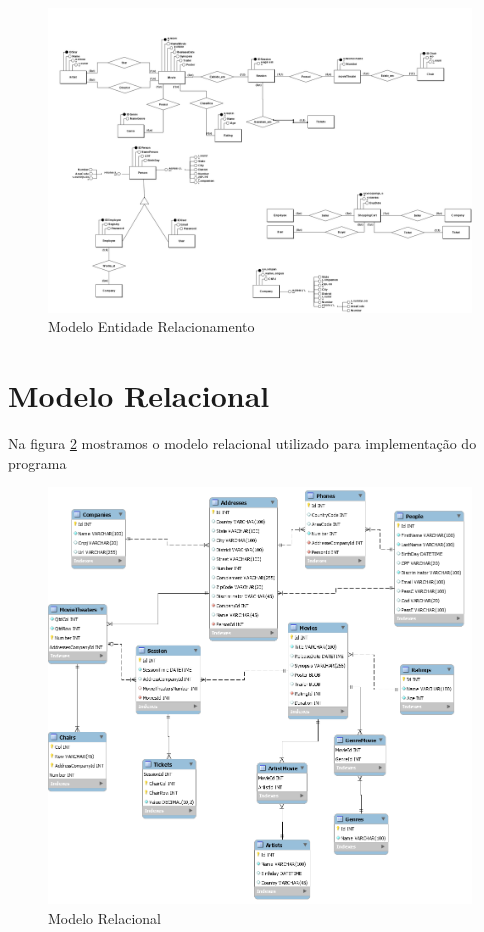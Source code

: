 \documentclass[a4paper,10pt]{article}
\begin{document}
\begin{figure}[h]
\includegraphics[width=\columnwidth]{UnBCineFlix_MER}%
\caption{Modelo Entidade Relacionamento}%
\label{fig:mer}%
\end{figure}

\section{Modelo Relacional}

Na figura \ref{fig:mr} mostramos o modelo relacional utilizado para implementação  do programa

\begin{figure}[h]
\includegraphics[width=\columnwidth]{UnBCineFlix_MR}%
\caption{Modelo Relacional}%
\label{fig:mr}%
\end{figure}
\end{document}
